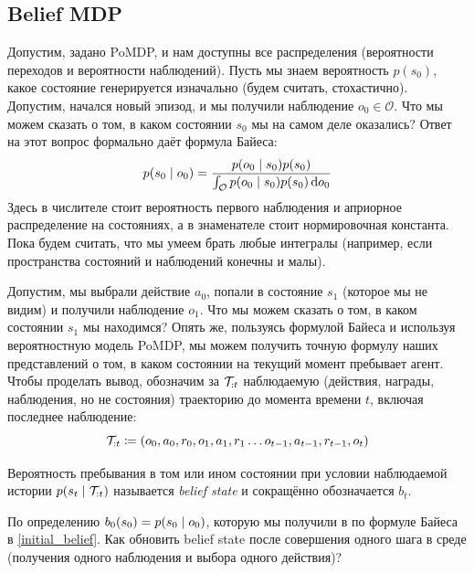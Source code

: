 \subsection{Belief MDP}

Допустим, задано PoMDP, и нам доступны все распределения (вероятности переходов и вероятности наблюдений). Пусть мы знаем вероятность $p(s_0)$, какое состояние генерируется изначально (будем считать, стохастично). Допустим, начался новый эпизод, и мы получили наблюдение $o_0 \in \mathcal{O}$. Что мы можем сказать о том, в каком состоянии $s_0$ мы на самом деле оказались? Ответ на этот вопрос формально даёт формула Байеса:
\begin{equation}\label{initial_belief}
p(s_0 \mid o_0) = \frac{p(o_0 \mid s_0)p(s_0)}{\int_{\mathcal{O}} p(o_0 \mid s_0)p(s_0) \mathop{}\!\mathrm{d} o_0}
\end{equation}
Здесь в числителе стоит вероятность первого наблюдения и априорное распределение на состояниях, а в знаменателе стоит нормировочная константа. Пока будем считать, что мы умеем брать любые интегралы (например, если пространства состояний и наблюдений конечны и малы).

Допустим, мы выбрали действие $a_0$, попали в состояние $s_1$ (которое мы не видим) и получили наблюдение $o_1$. Что мы можем сказать о том, в каком состоянии $s_1$ мы находимся? Опять же, пользуясь формулой Байеса и используя вероятностную модель PoMDP, мы можем получить точную формулу наших представлений о том, в каком состоянии на текущий момент пребывает агент. Чтобы проделать вывод, обозначим за $\mathcal{T}_{:t}$ наблюдаемую (действия, награды, наблюдения, но не состояния) траекторию до момента времени $t$, включая последнее наблюдение:
$$\mathcal{T}_{:t} \coloneqq (o_0, a_0, r_0, o_1, a_1, r_1 \dots o_{t - 1}, a_{t - 1}, r_{t - 1}, o_t)$$

\begin{definition}
Вероятность пребывания в том или ином состоянии при условии наблюдаемой истории $p(s_t \HM\mid \Traj_{:t})$ называется \emph{belief state} и сокращённо обозначается $b_t$.
\end{definition}

По определению $b_0(s_0) \HM= p(s_0 \HM\mid o_0)$, которую мы получили в по формуле Байеса в \eqref{initial_belief}. Как обновить belief state после совершения одного шага в среде (получения одного наблюдения и выбора одного действия)?

